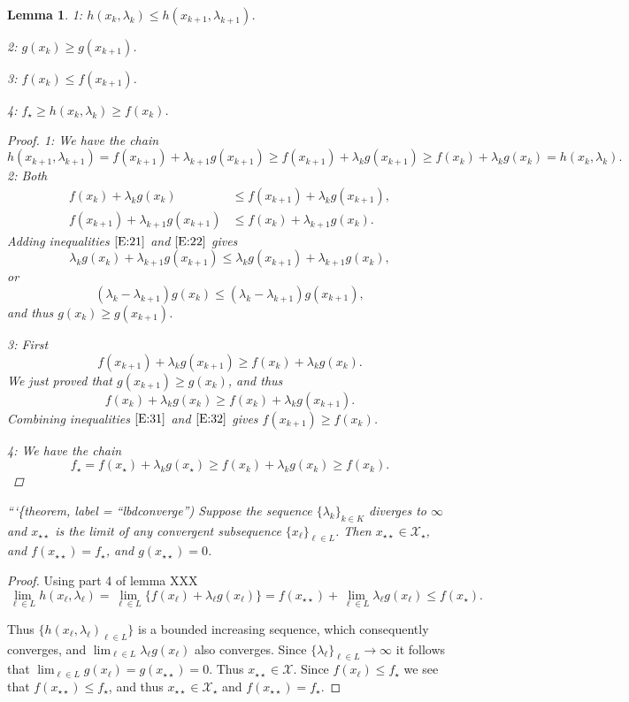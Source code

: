 \documentclass[
  12pt,
]{book}
\newtheorem{lemma}{Lemma}[chapter]
\theoremstyle{definition}
\theoremstyle{definition}
\theoremstyle{definition}
\theoremstyle{definition}
\theoremstyle{remark}
\begin{document}
\begin{lemma}
\protect\hypertarget{lem:lbdlemma}{}{\label{lem:lbdlemma} }
1: \(h(x_k,\lambda_k)\leq h(x_{k+1},\lambda_{k+1})\).

2: \(g(x_k)\geq g(x_{k+1})\).

3: \(f(x_k)\leq f(x_{k+1})\).

4: \(f_\star\geq h(x_k,\lambda_k)\geq f(x_k)\).

\begin{proof}
1: We have the chain
\[
h(x_{k+1},\lambda_{k+1})=f(x_{k+1})+\lambda_{k+1} g(x_{k+1})\geq f(x_{k+1})+\lambda_{k} g(x_{k+1})\geq f(x_{k})+\lambda_{k}g(x_k)=h(x_k,\lambda_k).
\]
2: Both
\begin{align}
f(x_k)+\lambda_k g(x_k)&\leq f(x_{k+1})+\lambda_k g(x_{k+1}),\label{E:21}\\
f(x_{k+1})+\lambda_{k+1} g(x_{k+1})&\leq f(x_k)+\lambda_{k+1} g(x_k).\label{E:22}
\end{align}
Adding inequalities \(\eqref{E:21}\) and \(\eqref{E:22}\) gives
\[
\lambda_k g(x_k)+\lambda_{k+1} g(x_{k+1})\leq\lambda_k g(x_{k+1})+\lambda_{k+1} g(x_k),
\]
or
\[
(\lambda_k-\lambda_{k+1})g(x_k)\leq(\lambda_k-\lambda_{k+1})g(x_{k+1}),
\]
and thus \(g(x_k)\geq g(x_{k+1})\).

3: First
\begin{equation}\label{E:31}
f(x_{k+1})+\lambda_k g(x_{k+1})\geq f(x_k)+\lambda_k g(x_k).
\end{equation}
We just proved that \(g(x_{k+1})\geq g(x_k)\), and thus
\begin{equation}\label{E:32}
f(x_k)+\lambda_k g(x_k)\geq f(x_k)+\lambda_k g(x_{k+1}).
\end{equation}
Combining inequalities \(\eqref{E:31}\) and \(\eqref{E:32}\) gives \(f(x_{k+1})\geq f(x_k)\).

4: We have the chain
\[
f_\star=f(x_\star)+\lambda_k g(x_\star)\geq f(x_k)+\lambda_k g(x_k)\geq f(x_k).
\]
\end{proof}

```\{theorem, label = ``lbdconverge'')
Suppose the sequence \(\{\lambda_k\}_{k\in K}\) diverges to \(\infty\) and \(x_{\star\star}\) is the limit of any convergent subsequence
\(\{x_\ell\}_{\ell\in L}\). Then \(x_{\star\star}\in\mathcal{X}_\star\), and \(f(x_{\star\star})=f_\star\), and \(g(x_{\star\star})=0\).
\end{lemma}

\begin{proof}
Using part 4 of lemma XXX
\[
\lim_{\ell\in L}h(x_\ell,\lambda_\ell)=\lim_{\ell\in L}\{f(x_\ell)+\lambda_\ell g(x_\ell)\}=f(x_{\star\star})+\lim_{\ell\in L}\lambda_\ell g(x_\ell)\leq f(x_\star).
\]

Thus \(\{h(x_\ell,\lambda_\ell)_{\ell\in L}\}\) is a bounded increasing sequence, which consequently converges, and \(\lim_{\ell\in L}\lambda_\ell g(x_\ell)\) also converges. Since \(\{\lambda_\ell\}_{\ell\in L}\rightarrow\infty\) it follows that \(\lim_{\ell\in L}g(x_\ell)=g(x_{\star\star})=0\). Thus \(x_{\star\star}\in\mathcal{X}\). Since \(f(x_\ell)\leq f_\star\) we see that \(f(x_{\star\star})\leq f_\star\), and thus \(x_{\star\star}\in\mathcal{X}_\star\) and \(f(x_{\star\star})=f_\star\).
\end{proof}
\end{document}
